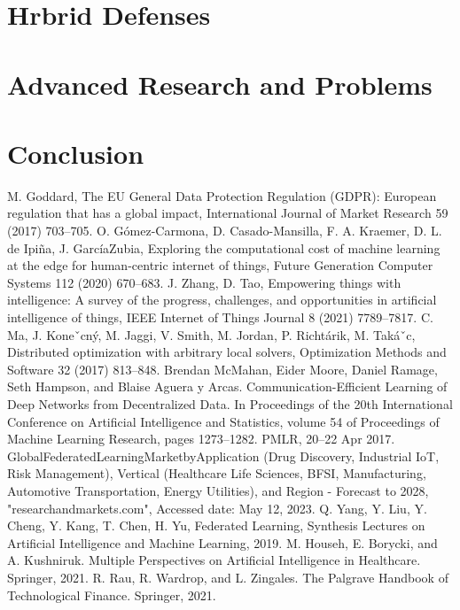 \documentclass[conference]{IEEEtran}
\begin{document}
\section{Hrbrid Defenses}  
\section{Advanced Research and Problems}  
\section{Conclusion}




\begin{thebibliography}{00}
     M. Goddard, The EU General Data Protection Regulation (GDPR): European regulation that has a global impact, International Journal of Market Research 59 (2017) 703–705.
     O. Gómez-Carmona, D. Casado-Mansilla, F. A. Kraemer, D. L. de Ipiña, J. GarcíaZubia, Exploring the computational cost of machine learning at the edge for human-centric internet of things, Future Generation Computer Systems 112 (2020) 670–683.
     J. Zhang, D. Tao, Empowering things with intelligence: A survey of the progress, challenges, and opportunities in artificial intelligence of things, IEEE Internet of Things Journal 8 (2021) 7789–7817.
     C. Ma, J. Koneˇcný, M. Jaggi, V. Smith, M. Jordan, P. Richtárik, M. Takáˇc, Distributed optimization with arbitrary local solvers, Optimization Methods and Software 32 (2017) 813–848.
     Brendan McMahan, Eider Moore, Daniel Ramage, Seth Hampson, and Blaise Aguera y Arcas. Communication-Efficient Learning of Deep Networks from Decentralized Data. In Proceedings of the 20th International Conference on Artificial Intelligence and Statistics, volume 54 of Proceedings of Machine Learning Research, pages 1273–1282. PMLR, 20–22 Apr 2017.
     GlobalFederatedLearningMarketbyApplication (Drug Discovery, Industrial IoT, Risk Management), Vertical (Healthcare  Life Sciences, BFSI, Manufacturing, Automotive Transportation, Energy  Utilities), and Region - Forecast to 2028, "researchandmarkets.com", Accessed date: May 12, 2023.
     Q. Yang, Y. Liu, Y. Cheng, Y. Kang, T. Chen, H. Yu, Federated Learning, Synthesis Lectures on Artificial Intelligence and Machine Learning, 2019.
     M. Househ, E. Borycki, and A. Kushniruk. Multiple Perspectives on Artificial Intelligence in Healthcare. Springer, 2021.
     R. Rau, R. Wardrop, and L. Zingales. The Palgrave Handbook of Technological Finance. Springer, 2021.

\end{thebibliography}
\end{document}
